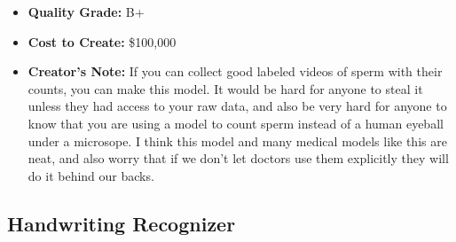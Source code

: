 \begin{itemize}
\begin{itemize}
    \item \textbf{Quality Grade:} B+
    \item \textbf{Cost to Create:} \$100,000
    \item \textbf{Creator's Note:} If you can collect good labeled videos of sperm with their counts, you can make this model. It would be hard for anyone to steal it unless they had access to your raw data, and also be very hard for anyone to know that you are using a model to count sperm instead of a human eyeball under a microsope. I think this model and many medical models like this are neat, and also worry that if we don't let doctors use them explicitly they will do it behind our backs. 
\end{itemize}

\subsection{Handwriting Recognizer}


\end{itemize}
